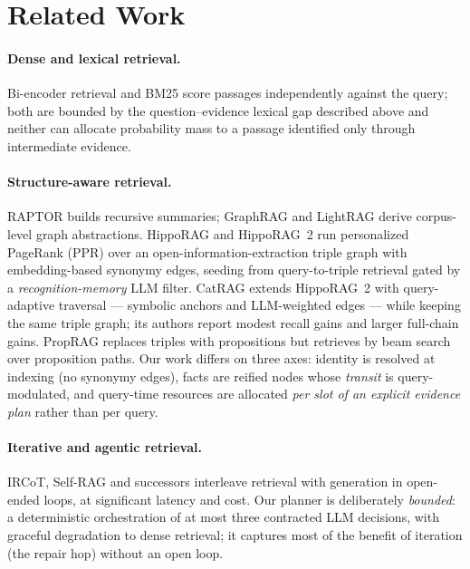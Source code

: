 \documentclass[11pt,a4paper]{article}
\newcommand{\hippo}{HippoRAG~2}
\begin{document}
\section{Related Work}
\label{sec:related}

\paragraph{Dense and lexical retrieval.} Bi-encoder retrieval and BM25 score
passages independently against the query; both are bounded by the
question--evidence lexical gap described above and neither can allocate
probability mass to a passage identified only through intermediate evidence.

\paragraph{Structure-aware retrieval.} RAPTOR builds recursive summaries;
GraphRAG and LightRAG derive corpus-level graph abstractions. HippoRAG and
\hippo{} run personalized PageRank (PPR) over an open-information-extraction
triple graph with embedding-based synonymy edges, seeding from
query-to-triple retrieval gated by a \emph{recognition-memory} LLM filter.
CatRAG extends \hippo{} with query-adaptive traversal --- symbolic anchors and
LLM-weighted edges --- while keeping the same triple graph; its authors report
modest recall gains and larger full-chain gains. PropRAG replaces triples
with propositions but retrieves by beam search over proposition paths. Our
work differs on three axes: identity is resolved at indexing (no synonymy
edges), facts are reified nodes whose \emph{transit} is query-modulated, and
query-time resources are allocated \emph{per slot of an explicit evidence
plan} rather than per query.

\paragraph{Iterative and agentic retrieval.} IRCoT, Self-RAG and successors
interleave retrieval with generation in open-ended loops, at significant
latency and cost. Our planner is deliberately \emph{bounded}: a deterministic
orchestration of at most three contracted LLM decisions, with graceful
degradation to dense retrieval; it captures most of the benefit of iteration
(the repair hop) without an open loop.

\end{document}

